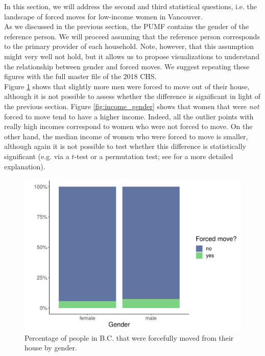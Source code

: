 \documentclass[11pt]{article}
\begin{document}
In this section, we will address the second and third statistical
questions, i.e. the landscape of forced moves for low-income women
in Vancouver.
\\

As we discussed in the previous section, the PUMF contains the gender
of the reference person. We will proceed assuming that the reference
person corresponds to the primary provider of each household.
Note, however, that this assumption might very well not hold, but it
allows us to propose visualizations to understand the relationship
between gender and forced moves. We suggest repeating these figures
with the full master file of the 2018 CHS.
\\


Figure \ref{fig:fm_gender} shows that slightly more men were forced to move
out of their house, although it is not possible to assess whether the
difference is significant in light of the previous section.
Figure \ref{fig:income_gender} shows that women that were \textit{not}
forced to move tend to have a higher income. Indeed, all the outlier points
with really high incomes correspond to women who were not forced to move.
On the other hand, the median income of women who were forced to move
is smaller, although again it is not possible to test whether this
difference is statistically significant (e.g. via a $t$-test or a
permutation test; see \cite[Ch.~9.3]{agresti} for a more detailed explanation).


\begin{figure}
  \centering
  \includegraphics[scale=0.5]{fig/fm_gender.pdf}
  \caption{Percentage of people in B.C. that were forcefully moved
  from their house by gender.}
  \label{fig:fm_gender}
\end{figure}
\end{document}
